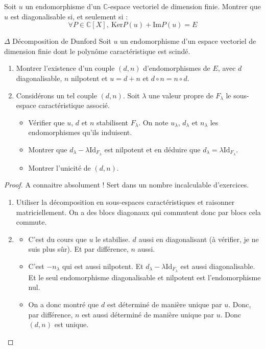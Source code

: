 \documentclass[french,a4paper]{article}
\newcommand{\C}{\mathbb{C}}
\renewcommand{\ker}{\text{Ker}}
\theoremstyle{plain}
\theoremstyle{definition}
\theoremstyle{remark}
\begin{document}
\begin{ex}{}
	Soit $u$ un endomorphisme d'un $\C$-espace vectoriel de dimension finie. Montrer que $u$ est diagonalisable si, et seulement si : $$\forall P\in\C[X],\ \ker P(u)+\text{Im}P(u)=E$$
\end{ex}

\begin{ex}{$\Delta$ Décomposition de Dunford}
	Soit $u$ un endomorphisme d'un espace vectoriel de dimension finie dont le polynôme caractéristique est scindé.
	\begin{enumerate}
		\item Montrer l'existence d'un couple $(d,n)$ d'endomorphismes de $E$, avec $d$ diagonalisable, $n$ nilpotent et $u=d+n$ et $d\circ n=n\circ d$.
		\item Considérons un tel couple $(d,n)$. Soit $\lambda$ une valeur propre de $F_\lambda$ le sous-espace caractéristique associé.
		\begin{itemize}
			\item Vérifier que $u$, $d$ et $n$ stabilisent $F_\lambda$. On note $u_\lambda$, $d_\lambda$ et $n_\lambda$ les endomorphismes qu'ils induisent.
			\item Montrer que $d_\lambda-\lambda\text{Id}_{F_\lambda}$ est nilpotent et en déduire que $d_\lambda=\lambda\text{Id}_{F_\lambda}$.
			\item Montrer l'unicité de $(d,n)$. 
		\end{itemize}
	\end{enumerate}
\end{ex}
\begin{proof}
	A connaitre absolument ! Sert dans un nombre incalculable d'exercices.
	\begin{enumerate}
		\item Utiliser la décomposition en sous-espaces caractéristiques et raisonner matriciellement. On a des blocs diagonaux qui commutent donc par blocs cela commute.
		\item \begin{itemize}
			\item C'est du cours que $u$ le stabilise. $d$ aussi en diagonalisant (à vérifier, je ne suis plus sûr). Et par différence, $n$ aussi.
			\item C'est $-n_\lambda$ qui est aussi nilpotent. Et $d_\lambda-\lambda\text{Id}_{F_\lambda}$ est aussi diagonalisable. Et le seul endomorphisme diagonalisable et nilpotent est l'endomorphisme nul.
			\item On a donc montré que $d$ est déterminé de manière unique par $u$. Donc, par différence, $n$ est aussi déterminé de manière unique par $u$. Donc $(d,n)$ est unique.
		\end{itemize}
	\end{enumerate}
\end{proof}
\end{document}
